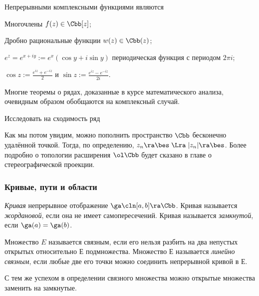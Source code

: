 \documentclass[a4paper]{article}
\begin{document}
\begin{ex}
Непрерывными комплексными функциями являются
\begin{items}{-2}
\item Многочлены $f(z) \in \Cbb[z]$;
\item Дробно рациональные функции $w(z) \in \Cbb(z)$;
\item $e^z = e^{x+iy} := e^x(\cos y + i\sin y)$ периодическая функция с периодом $2\pi i$;
\item $\cos z := \frac{e^{iz} + e^{- i z}}{2}$ и $\sin z := \frac{e^{iz} - e^{ - iz}}{2i}$.
\end{items}
\end{ex}

Многие теоремы о рядах, доказанные в курсе математического анализа, очевидным образом обобщаются на
комплексный случай.

\begin{problem}
Исследовать на сходимость ряд
\end{problem}

Как мы потом увидим, можно пополнить пространство $\Cbb$ бесконечно удалённой точкой. Тогда, по определению,
$z_n\ra\bes \; \Lra \; |z_n|\ra\bes$. Более подробно о топологии расширения $\ol\Cbb$ будет сказано в главе
о стереографической проекции.

\subsubsection{Кривые, пути и области}

\begin{df}
\emph{Кривая} непрерывное отображение $\ga\cln [a,b] \ra \Cbb$.
Кривая называется \emph{жордановой}, если она не имеет самопересечений. Кривая называется \emph{замкнутой},
если $\ga(a) = \ga(b)$.
\end{df}

\begin{df}
Множество $E$ называется связным, если его нельзя разбить на два непустых
открытых относительно $Е$ подмножества.
Множество $Е$ называется \emph{линейно связным}, если любые две его точки можно соединить непрерывной кривой в $Е$.
\end{df}

\begin{note}
С тем же успехом в определении связного множества можно открытые множества заменить на замкнутые.
\end{note}
\end{document}
